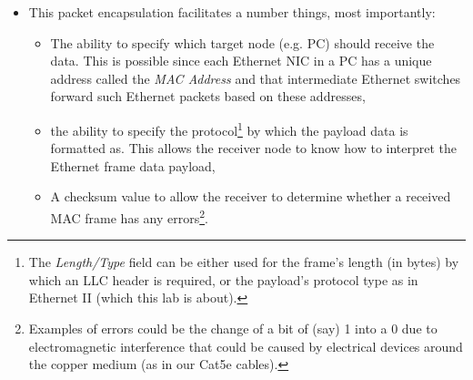 \documentclass[pdftex,12pt,a4paper]{article}
\begin{document}
\begin{itemize}
                \item This packet encapsulation facilitates a number things,
                most importantly:
                    \begin{itemize}
                        \item The ability to specify which target node (e.g.
                        PC) should receive the data.  This is possible since
                        each Ethernet NIC in a PC has a unique address called
                        the \emph{MAC Address} and that intermediate Ethernet
                        switches forward such Ethernet packets based on these
                        addresses,
                        \item the ability to specify the protocol\footnote{The
                        \emph{Length/Type} field can be either used for the frame's
                        length (in bytes) by which an LLC header is required,
                        or the payload's protocol type as in Ethernet II (which
                        this lab is about).} by
                        which the payload data is formatted as. This allows the
                        receiver node to know how to interpret the Ethernet
                        frame data payload,
                        \item A checksum value to allow the receiver to
                        determine whether a received MAC frame has any
                        errors\footnote{Examples of errors could be the change
                        of a bit of (say) 1 into a 0 due to electromagnetic
                        interference that could be caused by electrical devices
                        around the copper medium (as in our Cat5e cables).}.
                    \end{itemize}


\end{itemize}
\end{document}
